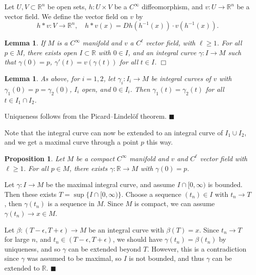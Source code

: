 \documentclass[letter-paper]{tufte-book}
\newtheorem{lemma}[theorem]{\color{pastel-blue}Lemma}
\newtheorem{proposition}[theorem]{\color{pastel-blue}Proposition}
\newenvironment{proof}[1][Proof]{\begin{trivlist}
\item[\hskip \labelsep {\bfseries #1}]}{\end{trivlist}}
\newcommand{\qed}{\hfill$\blacksquare$}
\newcommand{\qedwhite}{\hfill \ensuremath{\Box}}
\begin{document}
Let $U, V \subset \mathbb{R}^n$ be open sets, $h : U \times V$ be a $C^\infty$
diffeomorphism, and $v : U \to \mathbb{R}^n$ be a vector field. We define the
vector field on $v$ by
\begin{equation*}
  h * v : V \to \mathbb{R}^n, \quad h * v(x) = Dh\left(h^{-1}(x)\right)\cdot v(h^{-1}(x)).
\end{equation*}

\begin{lemma}
  If $M$ is a $C^\infty$ manifold and $v$ a $C^\ell$ vector field, with $\ell
  \geq 1$. For all $p \in M$, there exists open $I \subset \mathbb{R}$ with $0
  \in I$, and an integral curve $\gamma : I \to M$ such that $\gamma(0) = p$,
  $\gamma'(t) = v(\gamma(t))$ for all $t \in I$.
  \qedwhite
\end{lemma}

\begin{lemma}
  As above, for $i=1,2$, let $\gamma_i : I_i \to M$ be integral curves of $v$
  with $\gamma_1(0) = p = \gamma_2(0)$, $I_i$ open, and $0 \in I_i$. Then
  $\gamma_1(t) = \gamma_2(t)$ for all $t \in I_1 \cap I_2$.
\end{lemma}

\begin{proof}
  Uniqueness follows from the Picard--Lindel\"of theorem. \qed
\end{proof}

Note that the integral curve can now be extended to an integral curve of $I_1
\cup I_2$, and we get a maximal curve through a point $p$ this way.

\begin{proposition}
  Let $M$ be a compact $C^\infty$ manifold and $v$ and $C^\ell$ vector field
  with $\ell \geq 1$. For all $p \in M$, there exists $\gamma : \mathbb{R} \to
  M$ with $\gamma(0) = p$.
\end{proposition}

\begin{proof}
  Let $\gamma : I \to M$ be the maximal integral curve, and assume $I \cap [0,
  \infty)$ is bounded. Then these exists $T = \sup\{I \cap [0, \infty)\}$.
  Choose a sequence $(t_n) \in I$ with $t_n \to T$, then $\gamma(t_n)$ is a
  sequence in $M$. Since $M$ is compact, we can assume $\gamma(t_n) \to x \in
  M$.
  
  Let $\beta : (T-\epsilon, T+\epsilon) \to M$ be an integral curve with
  $\beta(T) = x$. Since $t_n \to T$ for large $n$, and $t_n \in (T-\epsilon,
  T+\epsilon)$, we should have $\gamma(t_n) = \beta(t_n)$ by uniqueness, and so
  $\gamma$ can be extended beyond $T$. However, this is a contradiction since
  $\gamma$ was assumed to be maximal, so $I$ is not bounded, and thus $\gamma$
  can be extended to $\mathbb{R}$. \qed
\end{proof}
\end{document}
